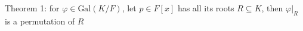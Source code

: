 \documentclass[preview]{standalone}
\begin{document}
\begin{center}
Theorem 1: for $\varphi \in \text{Gal}(K/F)$, let $p \in F[x]$ has all its roots $R \subseteq K$, then $\varphi|_R$ is a permutation of $R$
\end{center}
\end{document}
